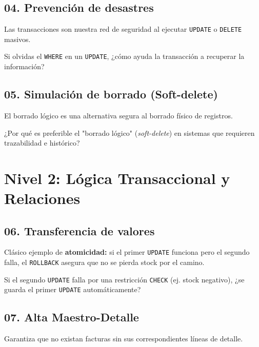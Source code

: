 \documentclass[12pt,a4paper]{article}
\begin{document}
\subsection{04. Prevención de desastres}
Las transacciones son nuestra red de seguridad al ejecutar \texttt{UPDATE} o \texttt{DELETE} masivos.


\begin{tcolorbox}[title=Reflexión 4]
Si olvidas el \texttt{WHERE} en un \texttt{UPDATE}, ¿cómo ayuda la transacción a recuperar la información?
\end{tcolorbox}

\subsection{05. Simulación de borrado (Soft-delete)}
El borrado lógico es una alternativa segura al borrado físico de registros.


\begin{tcolorbox}[title=Reflexión 5]
¿Por qué es preferible el "borrado lógico" (\textit{soft-delete}) en sistemas que requieren trazabilidad e histórico?
\end{tcolorbox}

\section{Nivel 2: Lógica Transaccional y Relaciones}

\subsection{06. Transferencia de valores}
Clásico ejemplo de \textbf{atomicidad:} si el primer \texttt{UPDATE} funciona pero el segundo falla, el \texttt{ROLLBACK} asegura que no se pierda stock por el camino. 


\begin{tcolorbox}[title=Reflexión 6]
Si el segundo \texttt{UPDATE} falla por una restricción \texttt{CHECK} (ej. stock negativo), ¿se guarda el primer \texttt{UPDATE} automáticamente?
\end{tcolorbox}

\subsection{07. Alta Maestro-Detalle}
Garantiza que no existan facturas sin sus correspondientes líneas de detalle.

\end{document}
